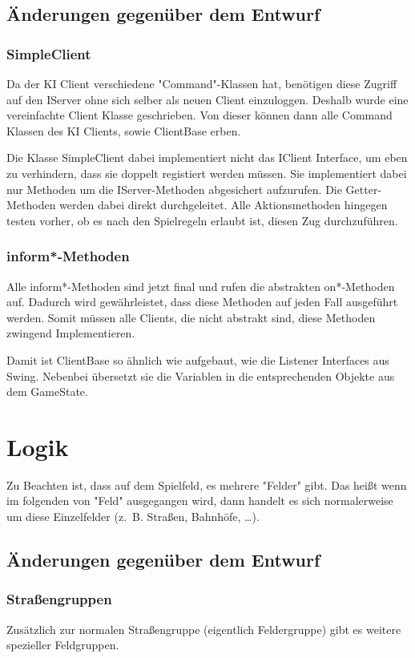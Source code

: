 \documentclass[a4paper,10pt]{article}
\begin{document}
\begin{itemize}
\subsection {Änderungen gegenüber dem Entwurf}
\subsubsection{SimpleClient}
Da der KI Client verschiedene "Command"-Klassen hat, benötigen diese Zugriff auf den IServer ohne sich selber als neuen Client einzuloggen. Deshalb wurde eine vereinfachte Client Klasse geschrieben. Von dieser können dann alle Command Klassen des KI Clients, sowie ClientBase erben.

Die Klasse SimpleClient dabei implementiert nicht das IClient Interface, um eben zu verhindern, dass sie doppelt registiert werden müssen. Sie implementiert dabei nur Methoden um die IServer-Methoden abgesichert aufzurufen. Die Getter-Methoden werden dabei direkt durchgeleitet. Alle Aktionsmethoden hingegen testen vorher, ob es nach den Spielregeln erlaubt ist, diesen Zug durchzuführen.
\subsubsection{inform*-Methoden}
Alle inform*-Methoden sind jetzt final und rufen die abstrakten on*-Methoden auf. Dadurch wird gewährleistet, dass diese Methoden auf jeden Fall ausgeführt werden. Somit müssen alle Clients, die nicht abstrakt sind, diese Methoden zwingend Implementieren.

Damit ist ClientBase so ähnlich wie aufgebaut, wie die Listener Interfaces aus Swing. Nebenbei übersetzt sie die Variablen in die entsprechenden Objekte aus dem GameState.

\section{Logik}
Zu Beachten ist, dass auf dem Spielfeld, es mehrere "Felder" gibt. Das heißt wenn im folgenden von "Feld" ausgegangen wird, dann handelt es sich normalerweise um diese Einzelfelder (z.~B. Straßen, Bahnhöfe, \dots).
\subsection {Änderungen gegenüber dem Entwurf}
\subsubsection{Straßengruppen}
Zusätzlich zur normalen Straßengruppe (eigentlich Feldergruppe) gibt es weitere spezieller Feldgruppen.


\end{itemize}
\end{document}
